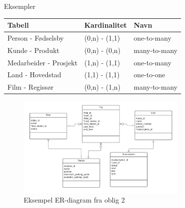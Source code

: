 \begin{frame}{Eksempler}
        
\begin{tabular}{l|l|l}
    Tabell & Kardinalitet & Navn\\\hline
    Person - Fødselsby & (0,n) - (1,1) & one-to-many\\
    Kunde - Produkt & (0,n) - (0,n) & many-to-many\\
    Medarbeider - Prosjekt & (1,n) - (1,1) & one-to-many\\
    Land - Hovedstad & (1,1) - (1,1) & one-to-one\\
    Film - Regissør & (0,n) - (1,n) & many-to-many
    \end{tabular}
\end{frame}

\begin{frame}{}
    \begin{figure}
        \centering
        \includegraphics[height = 4.9cm]{images/erdiagram.png}
        \caption{Eksempel ER-diagram fra oblig 2}
        \label{fig:erdiagram}
    \end{figure}
\end{frame}

